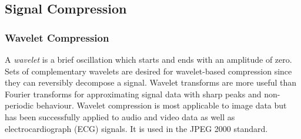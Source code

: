 \subsection{Signal Compression}

\subsubsection{Wavelet Compression}

A \textit{wavelet} is a brief oscillation which starts and ends with an amplitude of zero. Sets of complementary wavelets are desired for wavelet-based compression since they can reversibly decompose a signal. Wavelet transforms are more useful than Fourier transforms for approximating signal data with sharp peaks and non-periodic behaviour. Wavelet compression is most applicable to image data but has been successfully applied to audio and video data as well as electrocardiograph (ECG) signals. It is used in the JPEG 2000 standard.
